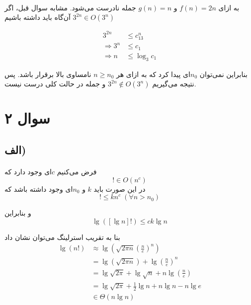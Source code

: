 \documentclass{article}
\begin{document}
	\paragraph*{}

	به ازای
	$f(n) = 2n$
	و
	$g(n) = n$
	جمله نادرست می‌شود. مشابه سوال قبل، اگر
	$3^{2n} \in O(3^n)$
	آن‌گاه باید داشته باشیم

	\begin{align*}
		3^{2n} &\le c_13^n \\
		\Rightarrow
		3^n &\le c_1 \\
		\Rightarrow
		n &\le \log_3 c_1
	\end{align*}

	بنابراین نمی‌توان
	$n_0$ای
	پیدا کرد که به ازای هر
	$n \ge n_0$
	نامساوی بالا برقرار باشد. پس نتیجه می‌گیریم
	$3^{2n} \notin O(3^n)$
	و جمله در حالت کلی درست نیست.

	\section*{سوال ۲}
	\subsection*{الف)}
	\paragraph*{}

	فرض می‌کنیم $c$ای وجود دارد که
	\begin{equation*}
		[\lg n]! \in O(n^c)
	\end{equation*}
	در این صورت باید
	$k$
	و
	$n_0$ای
	وجود داشته باشد که
	\begin{equation*}
		[\lg n]! \le kn^c \; (\forall n > n_0)
	\end{equation*}

	و بنابراین
	\begin{equation*}
		\lg([\lg n]!) \le ck \lg n
	\end{equation*}

	بنا به تقریب استرلینگ می‌توان نشان داد
	\begin{align*}
		\lg(n!) &\approx \lg\left(\sqrt{2\pi n}\left(\frac{n}{e}\right)^n\right) \\
		&=
		\lg\left(\sqrt{2\pi n}\right)
		+
		\lg \left(\frac{n}{e}\right)^n \\
		&=
		\lg \sqrt{2\pi} + \lg \sqrt{n} + n\lg \left(\frac{n}{e}\right) \\
		&=
		\lg \sqrt{2\pi} + \frac{1}{2}\lg n + n\lg n - n\lg e \\
		&\in \Theta(n \lg n)
	\end{align*}
\end{document}
